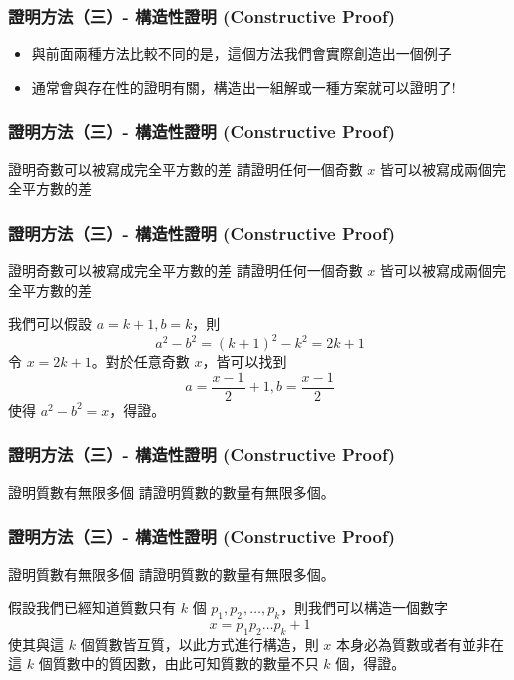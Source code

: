\documentclass[aspectratio=169]{beamer}
\begin{document}
\begin{frame}
\frametitle{證明方法（三）- 構造性證明 (Constructive Proof)}
    \begin{itemize}
        \item<1-> 與前面兩種方法比較不同的是，這個方法我們會實際創造出一個例子
        \item<2-> 通常會與存在性的證明有關，構造出一組解或一種方案就可以證明了!
    \end{itemize}
\end{frame}

\begin{frame}
\frametitle{證明方法（三）- 構造性證明 (Constructive Proof)}
    \begin{block}{證明奇數可以被寫成完全平方數的差}
        請證明任何一個奇數 $x$ 皆可以被寫成兩個完全平方數的差
    \end{block}
\end{frame}

\begin{frame}
\frametitle{證明方法（三）- 構造性證明 (Constructive Proof)}
    \begin{block}{證明奇數可以被寫成完全平方數的差}
        請證明任何一個奇數 $x$ 皆可以被寫成兩個完全平方數的差
    \end{block}
        
    我們可以假設 $a=k+1, b=k$，則 $$a^2-b^2 = (k+1)^2-k^2 = 2k+1$$
    令 $x=2k+1$。對於任意奇數 $x$，皆可以找到 $$a=\frac{x-1}{2}+1, b=\frac{x-1}{2}$$ 
    使得 $a^2-b^2=x$，得證。
\end{frame}

\begin{frame}
\frametitle{證明方法（三）- 構造性證明 (Constructive Proof)}
    \begin{block}{證明質數有無限多個}
        請證明質數的數量有無限多個。
    \end{block}
\end{frame}

\begin{frame}
\frametitle{證明方法（三）- 構造性證明 (Constructive Proof)}
    \begin{block}{證明質數有無限多個}
        請證明質數的數量有無限多個。
    \end{block}
    假設我們已經知道質數只有 $k$ 個 $p_1, p_2, \ldots, p_k$，則我們可以構造一個數字 $$x = p_1p_2\ldots p_k + 1$$使其與這 $k$ 個質數皆互質，以此方式進行構造，則 $x$ 本身必為質數或者有並非在這 $k$ 個質數中的質因數，由此可知質數的數量不只 $k$ 個，得證。
\end{frame}
\end{document}

